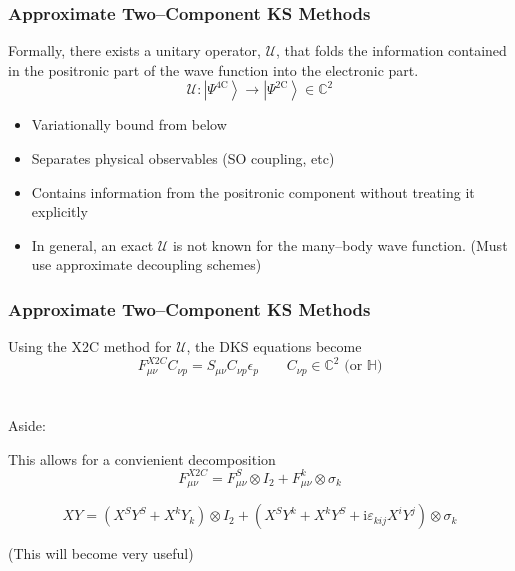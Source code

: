 \documentclass{beamer}
\newcommand{\bpar}[1]{\left( #1 \right)}                  %
\newcommand{\ket}[1]{\left \vert #1 \right \rangle}
\begin{document}
\begin{frame}
\frametitle{Approximate Two--Component KS Methods}

Formally, there exists a unitary operator, $\mathcal{U}$, that folds the information
contained in the positronic part of the wave function into the electronic part.
\begin{equation*}
\mathcal{U} : \ket{\Psi^\mathrm{4C}} \rightarrow \ket{\Psi^\mathrm{2C}} \in \mathbb{C}^2
\end{equation*}

\begin{itemize}
  \color{green}
  \item Variationally bound from below
  \item Separates physical observables (SO coupling, etc)
  \item Contains information from the positronic component without treating it explicitly
\end{itemize}

\begin{itemize}
  \color{red}
  \item In general, an exact $\mathcal{U}$ is not known for the many--body wave function.
  (Must use approximate decoupling schemes)
\end{itemize}

\end{frame}


\begin{frame}
\frametitle{Approximate Two--Component KS Methods}

Using the X2C method for $\mathcal{U}$, the DKS equations become
\begin{equation*}
F^{X2C}_{\mu\nu} C_{\nu p} = S_{\mu\nu} C_{\nu p} \epsilon_p \qquad C_{\nu p} \in \mathbb{C}^2 \text{ (or }\mathbb{H})
\end{equation*}
~\\
~\\
Aside: 

This allows for a convienient decomposition
\begin{equation*}
F_{\mu\nu}^{X2C} = F_{\mu\nu}^S \otimes I_2 + F_{\mu\nu}^k \otimes \sigma_k
\end{equation*}


\begin{equation*}
XY = \bpar{X^SY^S + X^kY_k} \otimes I_2 + \bpar{X^S Y^k + X^k Y^S + \mathrm{i}\varepsilon_{kij}X^iY^j}\otimes \sigma_k
\end{equation*}
\begin{center} (This will become very useful) \end{center}
\end{frame}
\end{document}
